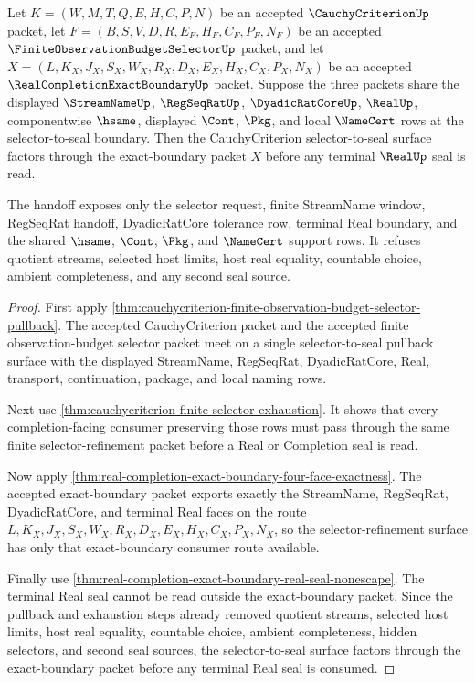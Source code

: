 \begin{theorem}
\label{thm:cauchycriterion-exact-boundary-selector-handoff}
Let $K=(W,M,T,Q,E,H,C,P,N)$ be an accepted $\CauchyCriterionUp$ packet, let
$F=(B,S,V,D,R,E_F,H_F,C_F,P_F,N_F)$ be an accepted
$\FiniteObservationBudgetSelectorUp$ packet, and let
$X=(L,K_X,J_X,S_X,W_X,R_X,D_X,E_X,H_X,C_X,P_X,N_X)$ be an accepted
$\RealCompletionExactBoundaryUp$ packet. Suppose the three packets share the
displayed $\StreamNameUp$, $\RegSeqRatUp$, $\DyadicRatCoreUp$, $\RealUp$,
componentwise $\hsame$, displayed $\Cont$, $\Pkg$, and local $\NameCert$ rows
at the selector-to-seal boundary. Then the CauchyCriterion selector-to-seal
surface factors through the exact-boundary packet $X$ before any terminal
$\RealUp$ seal is read.

The handoff exposes only the selector request, finite StreamName window,
RegSeqRat handoff, DyadicRatCore tolerance row, terminal Real boundary, and
the shared $\hsame$, $\Cont$, $\Pkg$, and $\NameCert$ support rows. It refuses
quotient streams, selected host limits, host real equality, countable choice,
ambient completeness, and any second seal source.
\end{theorem}
\begin{proof}
First apply
\autoref{thm:cauchycriterion-finite-observation-budget-selector-pullback}.
The accepted CauchyCriterion packet and the accepted finite observation-budget
selector packet meet on a single selector-to-seal pullback surface with the
displayed StreamName, RegSeqRat, DyadicRatCore, Real, transport,
continuation, package, and local naming rows.

Next use \autoref{thm:cauchycriterion-finite-selector-exhaustion}. It shows
that every completion-facing consumer preserving those rows must pass through
the same finite selector-refinement packet before a Real or Completion seal is
read.

Now apply
\autoref{thm:real-completion-exact-boundary-four-face-exactness}. The accepted
exact-boundary packet exports exactly the StreamName, RegSeqRat,
DyadicRatCore, and terminal Real faces on the route
$L,K_X,J_X,S_X,W_X,R_X,D_X,E_X,H_X,C_X,P_X,N_X$, so the selector-refinement
surface has only that exact-boundary consumer route available.

Finally use
\autoref{thm:real-completion-exact-boundary-real-seal-nonescape}. The terminal
Real seal cannot be read outside the exact-boundary packet. Since the pullback
and exhaustion steps already removed quotient streams, selected host limits,
host real equality, countable choice, ambient completeness, hidden selectors,
and second seal sources, the selector-to-seal surface factors through the
exact-boundary packet before any terminal Real seal is consumed.
\end{proof}

